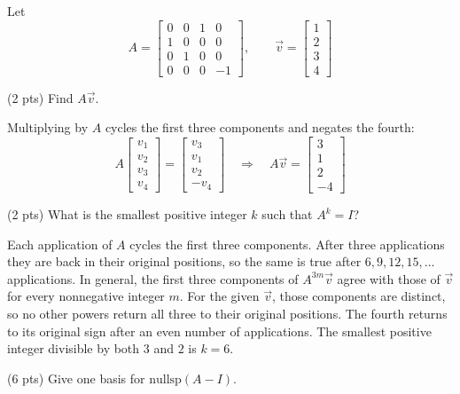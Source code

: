 \documentclass[11pt]{article}
\begin{document}
\begin{prob}[(16 pts)]
Let
\[
A=\begin{bmatrix}
0&0&1&0\\
1&0&0&0\\
0&1&0&0\\
0&0&0&-1
\end{bmatrix},\qquad
\vec v=\begin{bmatrix}1\\2\\3\\4\end{bmatrix}
\]
\begin{subprob}(2 pts)
Find $A\vec v$.\par\vspace{0.2em}

\begin{solution}
Multiplying by $A$ cycles the first three components and negates the fourth:
\[
A\begin{bmatrix}v_1\\v_2\\v_3\\v_4\end{bmatrix}
=\begin{bmatrix}v_3\\v_1\\v_2\\-v_4\end{bmatrix}
\quad\Longrightarrow\quad
\boxed{A\vec v=\begin{bmatrix}3\\1\\2\\-4\end{bmatrix}}
\]
\end{solution}
\end{subprob}
\begin{subprob}(2 pts)
What is the smallest positive integer $k$ such that $A^k=I$?


\begin{solution}
Each application of $A$ cycles the first three components. After three applications they are back in their original positions, so the same is true after $6,9,12,15,\ldots$ applications. In general, the first three components of $A^{3m}\vec v$ agree with those of $\vec v$ for every nonnegative integer $m$. For the given $\vec v$, those components are distinct, so no other powers return all three to their original positions. The fourth returns to its original sign after an even number of applications. The smallest positive integer divisible by both $3$ and $2$ is $\boxed{k=6}$.
\end{solution}
\end{subprob}
\begin{subprob}(6 pts)
Give one basis for $\text{nullsp}(A-I)$.\par\vspace{0.2em}


\end{subprob}
\end{prob}
\end{document}
